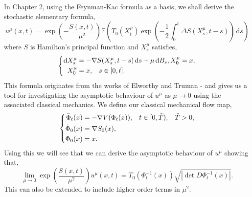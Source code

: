 \documentclass[a4paper,12pt,draft]{report}
\begin{document}
In Chapter 2, using the Feynman-Kac formula as a basis, we shall derive the stochastic elementary formula,
$$
u^\mu(x, t) = \exp\left(-\frac{S(x, t)}{\mu^2}\right)\mathbb{E}\left(T_0(X_t^\mu)\exp\left(-\frac{1}{2}\int_0^t\Delta S(X_s^\mu, t - s)\right)\,\mathrm{d}s\right)
$$
where $S$ is Hamilton's principal function and $X_s^\mu$ satisfies,
$$
\left\{
\begin{aligned}
\mathrm{d}X_s^\mu & = -\nabla S(X_s^\mu, t - s)\,\mathrm{d}s + \mu\,\mathrm{d}B_s, X_0^\mu = x, \\
X_0^\mu & = x, \hspace{0.3cm} s \in [0, t].
\end{aligned}
\right.
$$
This formula originates from the works of Elworthy and Truman \cite{SEF1} - \cite{SEF4} and gives us a tool for investigating the asymptotic behaviour of $u^\mu$ as $\mu \to 0$ using the associated classical mechanics.  We define our classical mechanical flow map,
$$
\left\{
\begin{aligned}
\ddot{\Phi}_t(x) & = -\nabla V(\Phi_t(x)), \hspace{0.3cm} t \in [0, \tilde{T}), \hspace{0.3cm} \tilde{T} > 0,\\
\dot{\Phi}_0(x) & = \nabla S_0(x), \\
\Phi_0(x) & = x.
\end{aligned}
\right.
$$
Using this we will see that we can derive the asymptotic behaviour of $u^\mu$ showing that,
$$
\lim_{\mu \to 0} \exp\left(\frac{S(x, t)}{\mu^2}\right)u^\mu(x, t) = T_0(\Phi_t^{-1}(x))\sqrt{|\det D\Phi_t^{-1}(x)|}.
$$
This can also be extended to include higher order terms in $\mu^2$.
\end{document}
